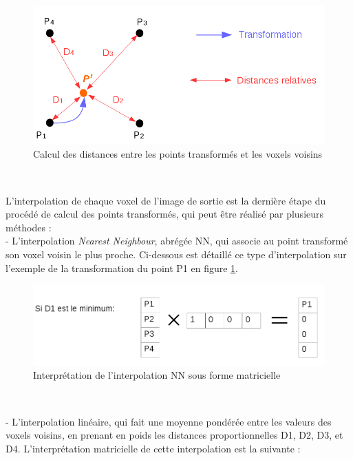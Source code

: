 \documentclass[10pt]{report}
\begin{document}
	\begin{figure}[h!]
		\begin{center}
			\includegraphics[width=12cm]{transform_image.png}	
		\end{center}
		\caption{Calcul des distances entre les points transformés et les voxels voisins}
		\label{Calcul des distances entre les points transformés et les voxels voisins}
	\end{figure}
	~\par 
	L'interpolation de chaque voxel de l'image de sortie est la dernière étape du procédé de calcul des points transformés, qui peut être réalisé par plusieurs méthodes :\\
	- L'interpolation \textit{Nearest Neighbour}, abrégée NN, qui associe au point transformé son voxel voisin le plus proche. Ci-dessous est détaillé ce type d'interpolation sur l'exemple de la transformation du point P1 en figure \ref{Calcul des distances entre les points transformés et les voxels voisins}.\\
	\begin{figure}[h!]
		\begin{center}
			\includegraphics[width=12cm]{calcul_interp_nn.png}	
		\end{center}
		\caption{Interprétation de l'interpolation NN sous forme matricielle}
		\label{Interprétation de l'interpolation NN sous forme matricielle}
	\end{figure}
	~\par 
	- L'interpolation linéaire, qui fait une moyenne pondérée entre les valeurs des voxels voisins, en prenant en poids les distances proportionnelles D1, D2, D3, et D4. L'interprétation matricielle de cette interpolation est la suivante :
\end{document}
